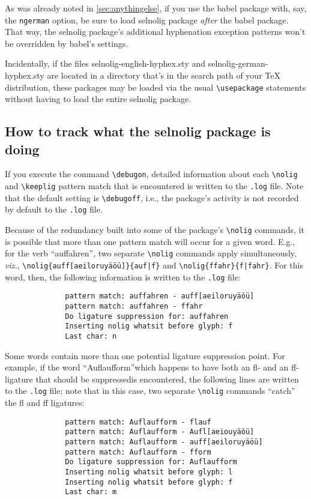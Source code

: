 \documentclass[11pt]{article}
\newcommand{\pkg}[1]{\textsf{#1}}
\newcommand{\opt}[1]{\texttt{#1}}
\newcommand{\cmmd}[1]{\texttt{\textbackslash #1}}
\begin{document}
As was already noted in \cref{sec:anythingelse}, if you use the \pkg{babel} package with, say, the \opt{ngerman} option, be sure to load \pkg{selnolig} package \emph{after} the \pkg{babel} package. That way, the \pkg{selnolig} package's additional hyphenation exception patterns won't be overridden by \pkg{babel}'s settings.

Incidentally, if the files \pkg{selnolig-english-hyphex.sty} and \pkg{selnolig-german-hyphex.sty} are located in a directory that's in the search path of your TeX distribution, these packages may be loaded via the usual \cmmd{usepackage} statements without having to load the entire \pkg{selnolig} package.



\subsection[How to track what the selnolig package is doing]{How to track what the \pkg{selnolig} package is doing} \label{sec:debugon}

If you execute the command \cmmd{debugon}, detailed information about each \cmmd{nolig} and \cmmd{keeplig} pattern match that is encountered is written to the \opt{.log} file. Note that the default setting is \cmmd{debugoff}, i.e., the package's activity is not recorded by default to the \opt{.log} file.


Because of the redundancy built into some of the package's \cmmd{nolig} commands, it is possible that more than one pattern match will occur for a given word. E.g., for the verb \enquote{auffahren}, two separate \cmmd{nolig} commands apply simultaneously, \emph{viz.}, \Verb+\nolig{auff[aeiloruyäöü]}{auf|f}+ and \Verb+\nolig{ffahr}{f|fahr}+. For this word, then, the following information is written to the \opt{.log} file:
\begin{Verbatim}
              pattern match: auffahren - auff[aeiloruyäöü]
              pattern match: auffahren - ffahr
              Do ligature suppression for: auffahren
              Inserting nolig whatsit before glyph: f
              Last char: n
\end{Verbatim}

Some words contain more than one potential ligature suppression point. For example, if the word \enquote{Auflaufform}\textemdash which happens to have both an fl- and an ff-ligature that should be suppressed\textemdash is encountered, the following lines are written to the \opt{.log} file; note that in this case, two separate \cmmd{nolig} commands \enquote{catch} the fl and ff ligatures:
\begin{Verbatim}
              pattern match: Auflaufform - flauf
              pattern match: Auflaufform - Aufl[aeiouyäöü]
              pattern match: Auflaufform - auff[aeiloruyäöü]
              pattern match: Auflaufform - fform
              Do ligature suppression for: Auflaufform
              Inserting nolig whatsit before glyph: l
              Inserting nolig whatsit before glyph: f
              Last char: m
\end{Verbatim}
\end{document}
